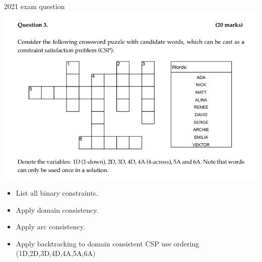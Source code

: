 \documentclass[11pt]{beamer}
\begin{document}
\begin{frame}{2021 exam question}
\includegraphics[scale=0.3]{images/2021.png}
\begin{itemize}
	\item List all binary constraints.
	\item Apply domain consistency.
	\item Apply arc consistency.
	\item Apply backtracking to domain consistent CSP use ordering (1D,2D,3D,4D,4A,5A,6A)
\end{itemize}
\end{frame}
\end{document}

